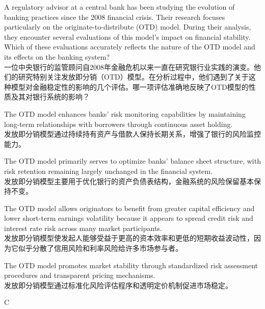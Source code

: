 \documentclass{article}
\newcounter{question} %
\begin{document}
\begin{question}
    A regulatory advisor at a central bank has been studying the evolution of banking practices since the 2008 financial crisis. Their research focuses particularly on the originate-to-distribute (OTD) model. During their analysis, they encounter several evaluations of this model's impact on financial stability. Which of these evaluations accurately reflects the nature of the OTD model and its effects on the banking system?\\
    一位中央银行的监管顾问自2008年金融危机以来一直在研究银行业实践的演变。他们的研究特别关注发放即分销（OTD）模型。在分析过程中，他们遇到了关于这种模型对金融稳定性的影响的几个评估。哪一项评估准确地反映了OTD模型的性质及其对银行系统的影响？
\end{question}
\begin{choices}
    \item The OTD model enhances banks' risk monitoring capabilities by maintaining long-term relationships with borrowers through continuous asset holding.\\
    发放即分销模型通过持续持有资产与借款人保持长期关系，增强了银行的风险监控能力。
    \item The OTD model primarily serves to optimize banks' balance sheet structure, with risk retention remaining largely unchanged in the financial system.\\
    发放即分销模型主要用于优化银行的资产负债表结构，金融系统的风险保留基本保持不变。
    \item The OTD model allows originators to benefit from greater capital efficiency and lower short-term earnings volatility because it appears to spread credit risk and interest rate risk across many market participants.\\
    发放即分销模型使发起人能够受益于更高的资本效率和更低的短期收益波动性，因为它似乎分散了信用风险和利率风险给许多市场参与者。
    \item The OTD model promotes market stability through standardized risk assessment procedures and transparent pricing mechanisms.\\
    发放即分销模型通过标准化风险评估程序和透明定价机制促进市场稳定。
\end{choices}

\begin{correctanswer}
    C
\end{correctanswer}
\end{document}
